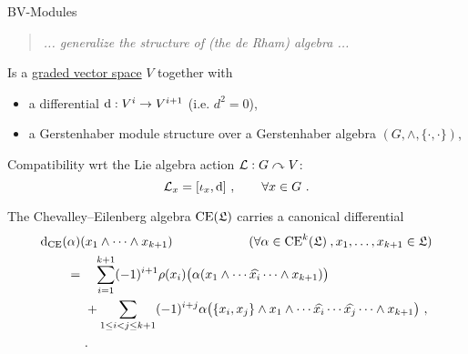 \documentclass[beamer,10pt,handout]{standalone}  \Handouttrue
\begin{document}
\begin{frame}{BV-Modules}
  \begin{quote}
    \centering
    \emph{... generalize the structure of (the de Rham) algebra ...}
  \end{quote}
  \begin{defblock}
    Is a \underline{graded vector space} $V$ together with
    \begin{itemize}[label=$\triangleright$]
      \item a differential $\mathop{}\!\mathrm{d}: V^i \to V^{i+1}$ (i.e. $d^2=0$),
      \item a Gerstenhaber module structure over a Gerstenhaber algebra $(G, \wedge, \lbrace\cdot,\cdot\rbrace)$,
    \end{itemize}
    Compatibility wrt the Lie algebra action $\mathcal{L}:G\curvearrowright V$: 
    $$
      \mathcal{L}_x = [\iota_x, \mathop{}\!\mathrm{d}]~, \qquad \forall x \in G~.
    $$
  \end{defblock}
  \vfill\pause

    \begin{exblock}
    The Chevalley--Eilenberg algebra  $\mathrm{CE}(\mathfrak{L})$
    carries a canonical differential
\begin{align*}
	\mathop{}\!\mathrm{d}_{\mathrm{CE}}(\alpha)&(x_1 \wedge \dotsb \wedge x_{k+1})
  \qquad\qquad\qquad {\tiny(
  \forall \alpha \in \mathrm{CE}^k(\mathfrak{L})~, x_1, \dotsc, x_{k+1} \in \mathfrak{L})}
  \\
  =&~\phantom{+} \sum_{i=1}^{k+1} (-1)^{i+1} \rho(x_i)\big(\alpha(x_1 \wedge \dotsb \widehat{x_i} \dotsb \wedge x_{k+1})\big) \\
	&~+ \sum_{1 \leq i < j \leq k+1} (-1)^{i+j} \alpha\big(\lbrace x_i, x_j\rbrace \wedge x_1 \wedge \dotsb \widehat{x_i} \dotsb \widehat{x_j} \dotsb \wedge x_{k+1}\big)~,\\
  &~.
\end{align*}
  \end{exblock}

\end{frame}
\end{document}
